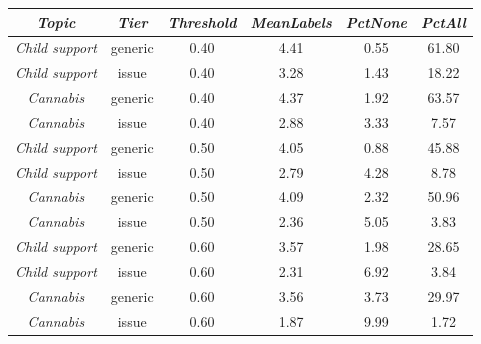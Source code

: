 \begin{tabular}{c c c c c c}
      \hline
      \textit{Topic} & \textit{Tier} & \textit{Threshold} & \textit{MeanLabels} & \textit{PctNone} & \textit{PctAll} \\
      \hline
      \textit{Child support} & generic & 0.40 & 4.41 & 0.55 & 61.80 \\
      \textit{Child support} & issue & 0.40 & 3.28 & 1.43 & 18.22 \\
      \textit{Cannabis} & generic & 0.40 & 4.37 & 1.92 & 63.57 \\
      \textit{Cannabis} & issue & 0.40 & 2.88 & 3.33 & 7.57 \\
      \textit{Child support} & generic & 0.50 & 4.05 & 0.88 & 45.88 \\
      \textit{Child support} & issue & 0.50 & 2.79 & 4.28 & 8.78 \\
      \textit{Cannabis} & generic & 0.50 & 4.09 & 2.32 & 50.96 \\
      \textit{Cannabis} & issue & 0.50 & 2.36 & 5.05 & 3.83 \\
      \textit{Child support} & generic & 0.60 & 3.57 & 1.98 & 28.65 \\
      \textit{Child support} & issue & 0.60 & 2.31 & 6.92 & 3.84 \\
      \textit{Cannabis} & generic & 0.60 & 3.56 & 3.73 & 29.97 \\
      \textit{Cannabis} & issue & 0.60 & 1.87 & 9.99 & 1.72 \\
      \hline
    \end{tabular}